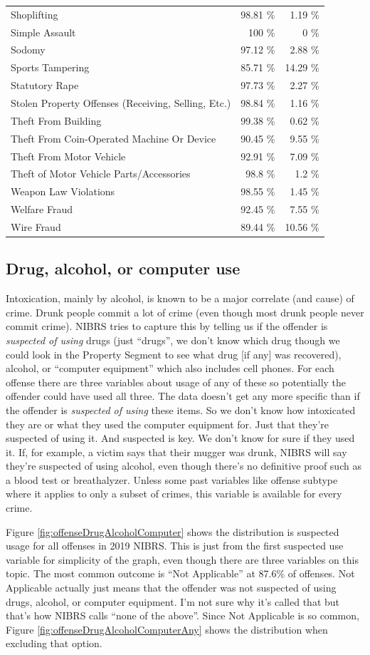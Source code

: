 \documentclass[
  12pt,
  openany]{book}
\begin{document}
\begin{longtable}[]{@{}lrr@{}}
Shoplifting & 98.81 \% & 1.19 \%\tabularnewline
Simple Assault & 100 \% & 0 \%\tabularnewline
Sodomy & 97.12 \% & 2.88 \%\tabularnewline
Sports Tampering & 85.71 \% & 14.29 \%\tabularnewline
Statutory Rape & 97.73 \% & 2.27 \%\tabularnewline
Stolen Property Offenses (Receiving, Selling, Etc.) & 98.84 \% & 1.16 \%\tabularnewline
Theft From Building & 99.38 \% & 0.62 \%\tabularnewline
Theft From Coin-Operated Machine Or Device & 90.45 \% & 9.55 \%\tabularnewline
Theft From Motor Vehicle & 92.91 \% & 7.09 \%\tabularnewline
Theft of Motor Vehicle Parts/Accessories & 98.8 \% & 1.2 \%\tabularnewline
Weapon Law Violations & 98.55 \% & 1.45 \%\tabularnewline
Welfare Fraud & 92.45 \% & 7.55 \%\tabularnewline
Wire Fraud & 89.44 \% & 10.56 \%\tabularnewline
\bottomrule
\end{longtable}

\hypertarget{drug-alcohol-or-computer-use}{%
\subsection{Drug, alcohol, or computer use}\label{drug-alcohol-or-computer-use}}

Intoxication, mainly by alcohol, is known to be a major correlate (and cause) of crime. Drunk people commit a lot of crime (even though most drunk people never commit crime). NIBRS tries to capture this by telling us if the offender is \emph{suspected of using} drugs (just ``drugs'', we don't know which drug though we could look in the Property Segment to see what drug {[}if any{]} was recovered), alcohol, or ``computer equipment'' which also includes cell phones. For each offense there are three variables about usage of any of these so potentially the offender could have used all three. The data doesn't get any more specific than if the offender is \emph{suspected of using} these items. So we don't know how intoxicated they are or what they used the computer equipment for. Just that they're suspected of using it. And suspected is key. We don't know for sure if they used it. If, for example, a victim says that their mugger was drunk, NIBRS will say they're suspected of using alcohol, even though there's no definitive proof such as a blood test or breathalyzer. Unless some past variables like offense subtype where it applies to only a subset of crimes, this variable is available for every crime.

Figure \ref{fig:offenseDrugAlcoholComputer} shows the distribution is suspected usage for all offenses in 2019 NIBRS. This is just from the first suspected use variable for simplicity of the graph, even though there are three variables on this topic. The most common outcome is ``Not Applicable'' at 87.6\% of offenses. Not Applicable actually just means that the offender was not suspected of using drugs, alcohol, or computer equipment. I'm not sure why it's called that but that's how NIBRS calls ``none of the above''. Since Not Applicable is so common, Figure \ref{fig:offenseDrugAlcoholComputerAny} shows the distribution when excluding that option.
\end{document}
